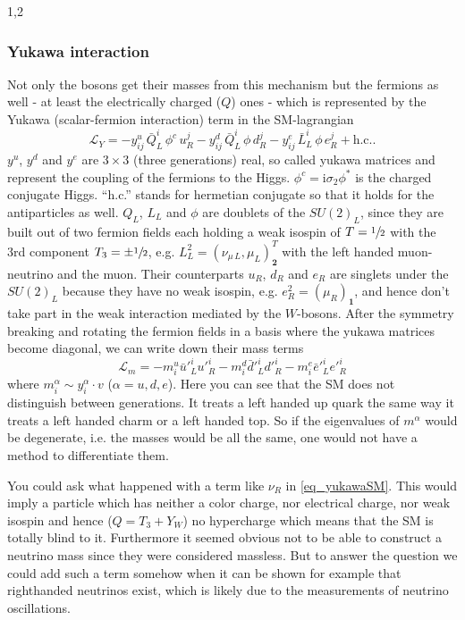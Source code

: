 \documentclass[11pt,a4paper,twoside]{article}
\newcommand{\ti}{\text{i}}
\begin{document}
\begin{spacing}{1,2}
\subsubsection{Yukawa interaction}
Not only the bosons get their masses from this mechanism but the fermions as well - at least the electrically charged ($Q$) ones - which is represented by the
Yukawa (scalar-fermion interaction) term in the SM-lagrangian
\begin{equation}
 \mathcal{L}_{Y} = - y^u_{ij}\, \bar Q^i_L \, \phi^c\, u^j_R - y^d_{ij}\, \bar Q^i_L\, \phi\, d^j_R - y^e_{ij}\, \bar L^i_L\, \phi\, e^j_R + \text{h.c.}.
 \label{eq_yukawaSM}
\end{equation}
\noindent
$y^u$, $y^d$ and $y^e$ are $3\times 3$ (three generations) real, so called yukawa matrices and represent the 
coupling of the fermions to the Higgs. $\phi^c = \ti\sigma_2\phi^*$ is the charged conjugate Higgs. ``h.c.'' stands for hermetian conjugate so that it holds for the antiparticles as well. 
$Q_L$, $L_L$ and $\phi$ are doublets of the $SU(2)_L$, since they are built out of two fermion fields each holding a 
weak isospin of $T=\sfrac12$ with the 3rd component $T_3 = \pm\sfrac12$, e.g. $L^2_L = (\nu_{\mu\, L}, \mu_L)^T_{\textbf{2}}$ with the left handed muon-neutrino and the muon. 
Their counterparts $u_R$, $d_R$ and $e_R$ are singlets under the $SU(2)_L$ because they have no weak isospin, e.g. $e^2_R = (\mu_R)_{\textbf{1}}$, and hence don't take part
in the weak interaction mediated by the $W$-bosons. After 
the symmetry breaking and rotating the fermion fields in a basis where the yukawa matrices become diagonal, we can write down their mass terms 
\begin{equation}
 \mathcal{L}_m = -m^u_i \bar u'^i_L u'^i_R -m^d_i \bar d'^i_L d'^i_R -m^e_i \bar e'^i_L e'^i_R 
 \label{eq_massSM}
\end{equation}
\noindent
where $m^\alpha_i \sim y^\alpha_i \cdot v$ ($\alpha = u,d,e$). Here you can see that the SM does not distinguish between generations. 
It treats a left handed up quark the same way it treats a left handed charm or a left handed top. So if the eigenvalues of $m^\alpha$ would be degenerate, i.e. the masses would
be all the same, one would not have a method to differentiate them. 

You could ask
what happened with a term like $\nu_R$ in \eqref{eq_yukawaSM}. This would imply a particle which has neither a color charge, nor electrical charge, nor 
weak isospin and hence ($Q = T_3 + Y_W$) no hypercharge which means that the SM is totally blind to it. Furthermore it seemed obvious not to be
able to construct a neutrino mass since they were considered massless. But to answer the question we could add 
such a term somehow when it can be shown for example that righthanded neutrinos exist, which is likely due to the measurements of neutrino oscillations.


\end{spacing}
\end{document}
